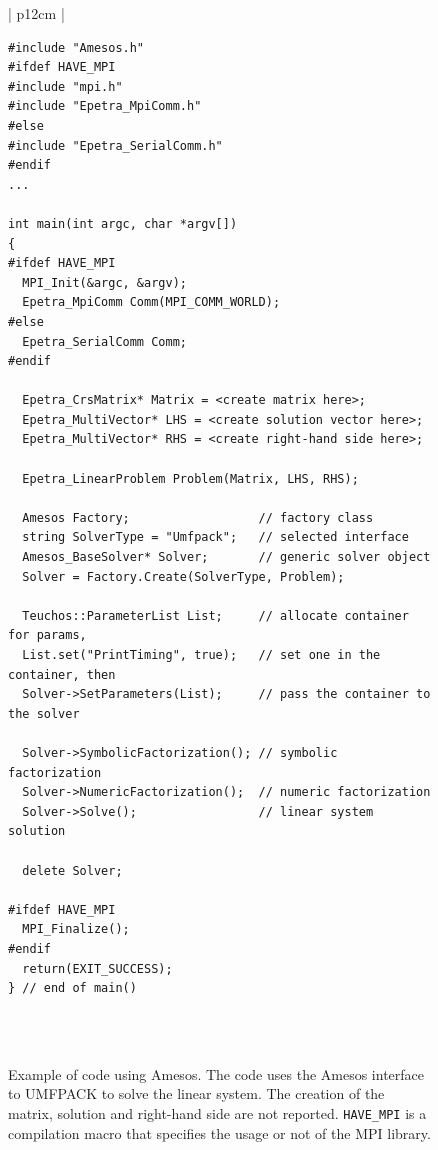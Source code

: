 \documentclass[acmtocl]{acmtrans2m}
\begin{document}
\begin{figure}
\begin{center}
\begin{tabular}{| p{12cm} | }
\hline
 \\
\begin{minipage}{12cm}
\begin{verbatim}
#include "Amesos.h"
#ifdef HAVE_MPI
#include "mpi.h"
#include "Epetra_MpiComm.h"
#else
#include "Epetra_SerialComm.h"
#endif
...

int main(int argc, char *argv[]) 
{
#ifdef HAVE_MPI
  MPI_Init(&argc, &argv);
  Epetra_MpiComm Comm(MPI_COMM_WORLD);
#else
  Epetra_SerialComm Comm;
#endif

  Epetra_CrsMatrix* Matrix = <create matrix here>;
  Epetra_MultiVector* LHS = <create solution vector here>;
  Epetra_MultiVector* RHS = <create right-hand side here>; 

  Epetra_LinearProblem Problem(Matrix, LHS, RHS);

  Amesos Factory;                  // factory class
  string SolverType = "Umfpack";   // selected interface
  Amesos_BaseSolver* Solver;       // generic solver object
  Solver = Factory.Create(SolverType, Problem);

  Teuchos::ParameterList List;     // allocate container for params,
  List.set("PrintTiming", true);   // set one in the container, then
  Solver->SetParameters(List);     // pass the container to the solver

  Solver->SymbolicFactorization(); // symbolic factorization
  Solver->NumericFactorization();  // numeric factorization
  Solver->Solve();                 // linear system solution

  delete Solver;
    
#ifdef HAVE_MPI
  MPI_Finalize();
#endif
  return(EXIT_SUCCESS);
} // end of main()
\end{verbatim}
\end{minipage} \\
 \\
 \hline
\end{tabular}
\caption{Example of code using Amesos. The code uses the Amesos interface to
  UMFPACK to solve the linear system. The creation of the matrix, solution and
    right-hand side are not reported. {\tt HAVE\_MPI} is a compilation macro
    that specifies the usage or not of the MPI library.}
\label{fig:example}
\end{center}
\end{figure}
\end{document}
